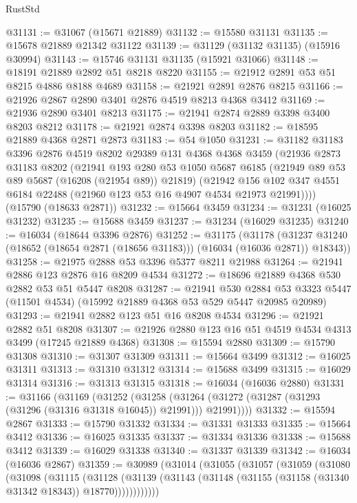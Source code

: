 \begin{lexlean}{RustStd}
\begin{coremodule}
@31131 := @31067 (@15671 @21889)
@31132 := @15580 @31131
@31135 := @15678 @21889 @21342 @31122
@31139 := @31129 (@31132 @31135) (@15916 @30994)
@31143 := @15746 @31131 @31135 (@15921 @31066)
@31148 := @18191 @21889 @2892 @51 @8218 @8220
@31155 := @21912 @2891 @53 @51 @8215 @4886 @8188 @4689
@31158 := @21921 @2891 @2876 @8215
@31166 := @21926 @2867 @2890 @3401 @2876 @4519 @8213 @4368 @3412
@31169 := @21936 @2890 @3401 @8213
@31175 := @21941 @2874 @2889 @3398 @3400 @8203 @8212
@31178 := @21921 @2874 @3398 @8203
@31182 := @18595 @21889 @4368 @2871 @2873
@31183 := @54 @1050
@31231 := @31182
    @31183
    @3396
    @2876
    @4519
    @8202
    @29389
    @131
    @4368
    @4368
    @3459
    (@21936
      @2873
      @31183
      @8202
      (@21941
        @193
        @280
        @53
        @1050
        @5687
        @6185
        (@21949 @89 @53 @89 @5687 (@16208 (@21954 @89)) @21819)
        (@21942 @156 @102 @347 @4551 @6184 @22488 (@21960 @123 @53 @16 @4907 @4534 @21973 @21991))))
    (@15790 (@18633 @2871))
@31232 := @15664 @3459
@31234 := @31231 (@16025 @31232)
@31235 := @15688 @3459
@31237 := @31234 (@16029 @31235)
@31240 := @16034 (@18644 @3396 @2876)
@31252 := @31175
    (@31178 (@31237 @31240 (@18652 (@18654 @2871 (@18656 @31183))) (@16034 (@16036 @2871)) @18343))
@31258 := @21975 @2888 @53 @3396 @5377 @8211 @21988
@31264 := @21941 @2886 @123 @2876 @16 @8209 @4534
@31272 := @18696 @21889 @4368 @530 @2882 @53 @51 @5447 @8208
@31287 := @21941
    @530
    @2884
    @53
    @3323
    @5447
    (@11501 @4534)
    (@15992 @21889 @4368 @53 @529 @5447 @20985 @20989)
@31293 := @21941 @2882 @123 @51 @16 @8208 @4534
@31296 := @21921 @2882 @51 @8208
@31307 := @21926 @2880 @123 @16 @51 @4519 @4534 @4313 @3499 (@17245 @21889 @4368)
@31308 := @15594 @2880
@31309 := @15790 @31308
@31310 := @31307 @31309
@31311 := @15664 @3499
@31312 := @16025 @31311
@31313 := @31310 @31312
@31314 := @15688 @3499
@31315 := @16029 @31314
@31316 := @31313 @31315
@31318 := @16034 (@16036 @2880)
@31331 := @31166
    (@31169
      (@31252
        (@31258 (@31264 (@31272 (@31287 (@31293 (@31296 (@31316 @31318 @16045)) @21991))) @21991))))
@31332 := @15594 @2867
@31333 := @15790 @31332
@31334 := @31331 @31333
@31335 := @15664 @3412
@31336 := @16025 @31335
@31337 := @31334 @31336
@31338 := @15688 @3412
@31339 := @16029 @31338
@31340 := @31337 @31339
@31342 := @16034 (@16036 @2867)
@31359 := @30989
    (@31014
      (@31055
        (@31057
          (@31059
            (@31080
              (@31098
                (@31115
                  (@31128
                    (@31139
                      (@31143 (@31148 (@31155 (@31158 (@31340 @31342 @18343)) @18770))))))))))))

\end{coremodule}
\end{lexlean}
